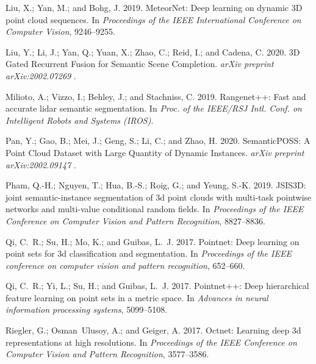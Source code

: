 \documentclass[letterpaper]{article} \usepackage{aaai21}  \usepackage{times}  \usepackage{helvet} \usepackage{courier}  \usepackage[hyphens]{url}  \usepackage{graphicx} \urlstyle{rm} \def\UrlFont{\rm}  \usepackage{natbib}  \usepackage{booktabs}
\begin{document}
\begin{thebibliography}{48}
Liu, X.; Yan, M.; and Bohg, J. 2019.
\newblock MeteorNet: Deep learning on dynamic 3D point cloud sequences.
\newblock In \emph{Proceedings of the IEEE International Conference on Computer
  Vision}, 9246--9255.

Liu, Y.; Li, J.; Yan, Q.; Yuan, X.; Zhao, C.; Reid, I.; and Cadena, C. 2020.
\newblock 3D Gated Recurrent Fusion for Semantic Scene Completion.
\newblock \emph{arXiv preprint arXiv:2002.07269} .

Milioto, A.; Vizzo, I.; Behley, J.; and Stachniss, C. 2019.
\newblock Rangenet++: Fast and accurate lidar semantic segmentation.
\newblock In \emph{Proc. of the IEEE/RSJ Intl. Conf. on Intelligent Robots and
  Systems (IROS)}.

Pan, Y.; Gao, B.; Mei, J.; Geng, S.; Li, C.; and Zhao, H. 2020.
\newblock SemanticPOSS: A Point Cloud Dataset with Large Quantity of Dynamic
  Instances.
\newblock \emph{arXiv preprint arXiv:2002.09147} .

Pham, Q.-H.; Nguyen, T.; Hua, B.-S.; Roig, G.; and Yeung, S.-K. 2019.
\newblock JSIS3D: joint semantic-instance segmentation of 3d point clouds with
  multi-task pointwise networks and multi-value conditional random fields.
\newblock In \emph{Proceedings of the IEEE Conference on Computer Vision and
  Pattern Recognition}, 8827--8836.

Qi, C.~R.; Su, H.; Mo, K.; and Guibas, L.~J. 2017{}.
\newblock Pointnet: Deep learning on point sets for 3d classification and
  segmentation.
\newblock In \emph{Proceedings of the IEEE conference on computer vision and
  pattern recognition}, 652--660.

Qi, C.~R.; Yi, L.; Su, H.; and Guibas, L.~J. 2017{}.
\newblock Pointnet++: Deep hierarchical feature learning on point sets in a
  metric space.
\newblock In \emph{Advances in neural information processing systems},
  5099--5108.

Riegler, G.; Osman~Ulusoy, A.; and Geiger, A. 2017.
\newblock Octnet: Learning deep 3d representations at high resolutions.
\newblock In \emph{Proceedings of the IEEE Conference on Computer Vision and
  Pattern Recognition}, 3577--3586.


\end{thebibliography}
\end{document}
